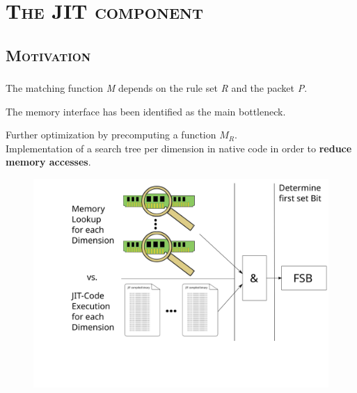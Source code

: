 \documentclass[xcolor=x11names,compress]{beamer}
\renewcommand{\(}{\begin{columns}}
\renewcommand{\)}{\end{columns}}
\newcommand{\<}[1]{\begin{column}{#1}}
\renewcommand{\>}{\end{column}}
\begin{document}
\section{\scshape The JIT component}
\subsection{\scshape Motivation}
\begin{frame}
  \frametitle{\insertsubsection}
  \begin{tcolorbox}[colback=teal!5!white,colframe=teal!75!black,title=Reminder,drop fuzzy shadow]
  The matching function \textit{M} depends on the rule set \textit{R} and the packet \textit{P}.
  \end{tcolorbox}
  \begin{tcolorbox}[colback=red!5!white,colframe=red!75!black,title=Bottleneck,drop fuzzy shadow]
  The memory interface has been identified as the main bottleneck.
  \end{tcolorbox}
  \begin{tcolorbox}[colback=blue!5!white,colframe=blue!75!black,title=Idea,drop fuzzy shadow]
  Further optimization by precomputing a function $M_R$.\\
  Implementation of a search tree per dimension in native code in order to \textbf{reduce memory accesses}.
  \end{tcolorbox}
\end{frame}

\begin{frame}
  \begin{figure}
  \centering
  \includegraphics[width=\textwidth]{figures/flowchart}
  \end{figure}
\end{frame}
\end{document}
